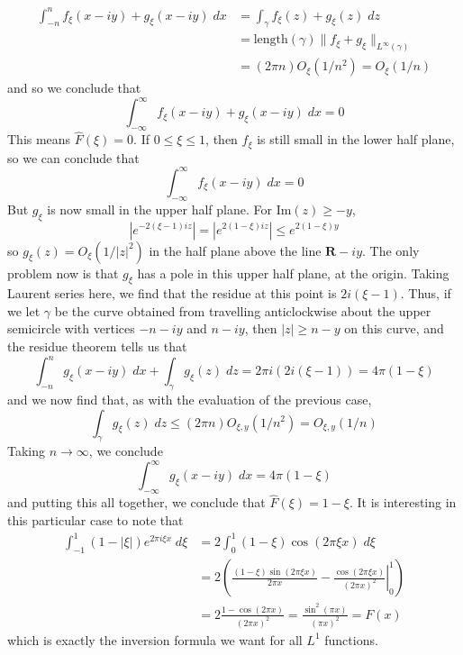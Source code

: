 \begin{example}
	\begin{align*}
		\int_{-n}^n f_\xi(x - iy) + g_\xi(x - iy)\; dx &= \int_\gamma f_\xi(z) + g_\xi(z)\; dz\\
		&= \text{length}(\gamma) \| f_\xi + g_\xi \|_{L^\infty(\gamma)}\\
		&= (2 \pi n) O_\xi(1/n^2) = O_\xi(1/n)
	\end{align*}
	and so we conclude that
	\[ \int_{-\infty}^\infty f_\xi(x - iy) + g_\xi(x - iy)\; dx = 0 \]
	This means $\widehat{F}(\xi) = 0$. If $0 \leq \xi \leq 1$, then $f_\xi$ is still small in the lower half plane, so we can conclude that
	\[ \int_{-\infty}^\infty f_\xi(x - iy)\; dx = 0 \]
	But $g_\xi$ is now small in the upper half plane. For $\text{Im}(z) \geq -y$,
	\[ |e^{-2(\xi - 1)iz}| = |e^{2(1 - \xi)iz}| \leq e^{2(1 - \xi)y} \] 
	so $g_\xi(z) = O_\xi(1/|z|^2)$ in the half plane above the line $\mathbf{R} - iy$. The only problem now is that $g_\xi$ has a pole in this upper half plane, at the origin. Taking Laurent series here, we find that the residue at this point is $2i(\xi - 1)$. Thus, if we let $\gamma$ be the curve obtained from travelling anticlockwise about the upper semicircle with vertices $-n - iy$ and $n - iy$, then $|z| \geq n - y$ on this curve, and the residue theorem tells us that
	\[ \int_{-n}^n g_\xi(x - iy)\; dx + \int_\gamma g_\xi(z)\; dz = 2\pi i (2i(\xi - 1)) = 4 \pi (1 - \xi) \]
	and we now find that, as with the evaluation of the previous case,
	\[ \int_\gamma g_\xi(z)\; dz \leq (2 \pi n) O_{\xi,y}(1/n^2) = O_{\xi,y}(1/n) \]
	Taking $n \to \infty$, we conclude
	\[ \int_{-\infty}^\infty g_\xi(x - iy)\; dx = 4 \pi (1 - \xi) \]
	and putting this all together, we conclude that $\widehat{F}(\xi) = 1 - \xi$. It is interesting in this particular case to note that
	\begin{align*}
		\int_{-1}^1 (1 - |\xi|) e^{2 \pi i\xi x}\; d\xi &= 2 \int_0^1 (1 - \xi) \cos(2 \pi \xi x)\; d\xi\\
		&= 2 \left( \left. \frac{(1 - \xi) \sin(2 \pi \xi x)}{2 \pi x} - \frac{\cos(2 \pi \xi x)}{(2 \pi x)^2} \right|_0^1 \right)\\
		&= 2 \frac{1 - \cos(2 \pi x)}{(2 \pi x)^2} = \frac{\sin^2(\pi x)}{(\pi x)^2} = F(x)
	\end{align*}
	which is exactly the inversion formula we want for all $L^1$ functions.
\end{example}

